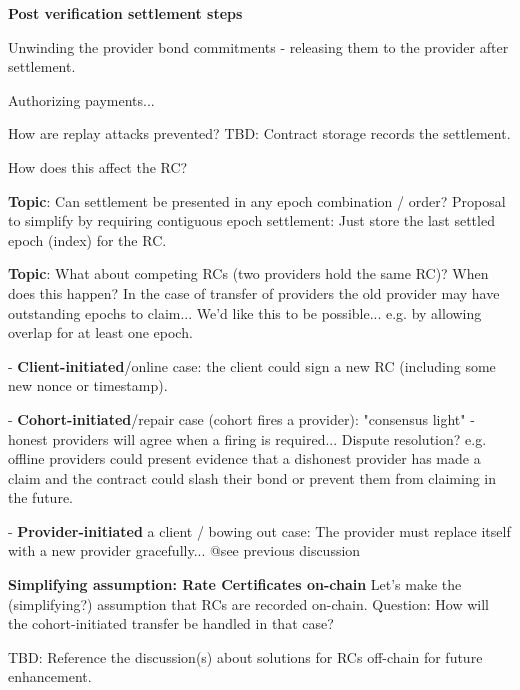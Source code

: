 \documentclass{article}
\begin{document}
\textbf{Post verification settlement steps}

Unwinding the provider bond commitments - releasing them to the provider after settlement.

Authorizing payments...

How are replay attacks prevented?  
TBD: Contract storage records the settlement.

How does this affect the RC?

\textbf{Topic}: Can settlement be presented in any epoch combination / order?  
Proposal to simplify by requiring contiguous epoch settlement:
Just store the last settled epoch (index) for the RC.

\textbf{
Topic}: What about competing RCs  (two providers hold the same RC)?
When does this happen?  In the case of transfer of providers the old provider may have outstanding epochs to claim... We'd like this to be possible... e.g. by allowing overlap for at least one epoch.

- \textbf{Client-initiated}/online case: 
the client could sign a new RC (including some new nonce or timestamp).

- \textbf{Cohort-initiated}/repair case (cohort fires a provider):
"consensus light" - honest providers will agree when a firing is required...
Dispute resolution?  e.g. offline providers could present evidence that a dishonest provider has made a claim and the contract could slash their bond or prevent them from claiming in the future.

- \textbf{Provider-initiated} a client / bowing out case: 
The provider must replace itself with a new provider gracefully...
@see previous discussion 

\textbf{Simplifying assumption: Rate Certificates on-chain}
Let's make the (simplifying?) assumption that RCs are recorded on-chain.  Question: How will the cohort-initiated transfer be handled in that case?

TBD: Reference the discussion(s) about solutions for RCs off-chain for future enhancement.
\end{document}
